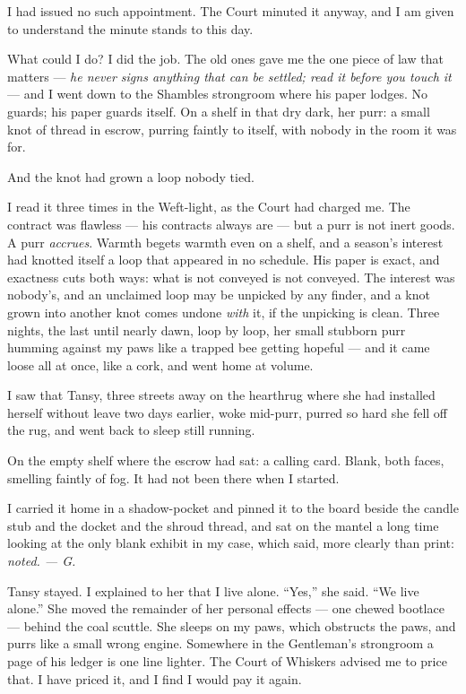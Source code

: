 I had issued no such appointment. The Court minuted it anyway, and I am given to understand the minute stands to this day.

What could I do? I did the job. The old ones gave me the one piece of law that matters --- \emph{he never signs anything that can be settled; read it before you touch it} --- and I went down to the Shambles strongroom where his paper lodges. No guards; his paper guards itself. On a shelf in that dry dark, her purr: a small knot of thread in escrow, purring faintly to itself, with nobody in the room it was for.

And the knot had grown a loop nobody tied.

I read it three times in the Weft-light, as the Court had charged me. The contract was flawless --- his contracts always are --- but a purr is not inert goods. A purr \emph{accrues}. Warmth begets warmth even on a shelf, and a season's interest had knotted itself a loop that appeared in no schedule. His paper is exact, and exactness cuts both ways: what is not conveyed is not conveyed. The interest was nobody's, and an unclaimed loop may be unpicked by any finder, and a knot grown into another knot comes undone \emph{with} it, if the unpicking is clean. Three nights, the last until nearly dawn, loop by loop, her small stubborn purr humming against my paws like a trapped bee getting hopeful --- and it came loose all at once, like a cork, and went home at volume.

I saw that Tansy, three streets away on the hearthrug where she had installed herself without leave two days earlier, woke mid-purr, purred so hard she fell off the rug, and went back to sleep still running.

On the empty shelf where the escrow had sat: a calling card. Blank, both faces, smelling faintly of fog. It had not been there when I started.

I carried it home in a shadow-pocket and pinned it to the board beside the candle stub and the docket and the shroud thread, and sat on the mantel a long time looking at the only blank exhibit in my case, which said, more clearly than print: \emph{noted. --- G.}

Tansy stayed. I explained to her that I live alone. ``Yes,'' she said. ``We live alone.'' She moved the remainder of her personal effects --- one chewed bootlace --- behind the coal scuttle. She sleeps on my paws, which obstructs the paws, and purrs like a small wrong engine. Somewhere in the Gentleman's strongroom a page of his ledger is one line lighter. The Court of Whiskers advised me to price that. I have priced it, and I find I would pay it again.

